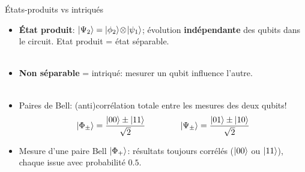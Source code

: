 \documentclass[aspectratio=169,12pt]{beamer}
\begin{document}

\begin{frame}{États-produits vs intriqués}
  \begin{itemize}[<+->]
    \item \textbf{État produit}: $\ket{\Psi_2}=\ket{\phi_2}\!\otimes\!\ket{\psi_1}$; évolution \textbf{indépendante} des qubits dans le circuit. Etat produit = état séparable.
    \\~\\
    \item \textbf{Non séparable} = intriqué: mesurer un qubit influence l'autre.
    \\~\\
    \item Paires de Bell: (anti)corrélation totale entre les mesures des deux qubits!
    \begin{align*}
      \ket{\Phi_{\pm}}=\frac{\ket{00}\pm\ket{11}}{\sqrt{2}}
      \qquad\qquad
      \ket{\Psi_{\pm}}=\frac{\ket{01}\pm\ket{10}}{\sqrt{2}}
    \end{align*}
    \item Mesure d'une paire Bell $\ket{\Phi_+}$: résultats toujours corrélés ($\ket{00}$ ou $\ket{11}$), chaque issue avec probabilité $0.5$.
  \end{itemize}
\end{frame}
\end{document}
